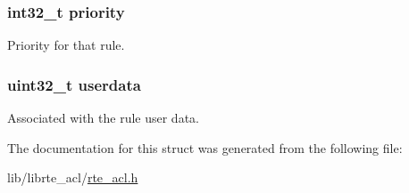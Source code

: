 \subsubsection[{priority}]{\setlength{\rightskip}{0pt plus 5cm}int32\+\_\+t priority}\label{structrte__acl__rule__data_a41b7c4ba47c44a632d5903b1f1338ad0}
Priority for that rule. \hypertarget{structrte__acl__rule__data_a5ebe574f1b536f72c61731511ca74ef5}{}
\subsubsection[{userdata}]{\setlength{\rightskip}{0pt plus 5cm}uint32\+\_\+t userdata}\label{structrte__acl__rule__data_a5ebe574f1b536f72c61731511ca74ef5}
Associated with the rule user data. 

The documentation for this struct was generated from the following file\+:\begin{DoxyCompactItemize}
\item 
lib/librte\+\_\+acl/\hyperlink{rte__acl_8h}{rte\+\_\+acl.\+h}\end{DoxyCompactItemize}
